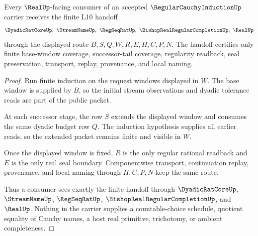 \begin{theorem}
\label{thm:regular-cauchy-induction-finite-window}
Every $\RealUp$-facing consumer of an accepted $\RegularCauchyInductionUp$ carrier receives the finite L10 handoff
$$
\DyadicRatCoreUp,\ \StreamNameUp,\ \RegSeqRatUp,\ \BishopRealRegularCompletionUp,\ \RealUp
$$
through the displayed route $B,S,Q,W,R,E,H,C,P,N$. The handoff certifies only finite base-window coverage, successor-tail coverage, regularity readback, seal preservation, transport, replay, provenance, and local naming.
\end{theorem}
\begin{proof}
Run finite induction on the request windows displayed in $W$. The base window is supplied by $B$, so the initial stream observations and dyadic tolerance reads are part of the public packet.

At each successor stage, the row $S$ extends the displayed window and consumes the same dyadic budget row $Q$. The induction hypothesis supplies all earlier reads, so the extended packet remains finite and visible in $W$.

Once the displayed window is fixed, $R$ is the only regular rational readback and $E$ is the only real seal boundary. Componentwise transport, continuation replay, provenance, and local naming through $H,C,P,N$ keep the same route.

Thus a consumer sees exactly the finite handoff through $\DyadicRatCoreUp$, $\StreamNameUp$, $\RegSeqRatUp$, $\BishopRealRegularCompletionUp$, and $\RealUp$. Nothing in the carrier supplies a countable-choice schedule, quotient equality of Cauchy names, a host real primitive, trichotomy, or ambient completeness.
\end{proof}


\begin{closurestatus}{\RegularCauchyInductionUp}
  \theoryclosure{\seedClosure}
  \formalstatus{\unformalizedV}
\end{closurestatus}
